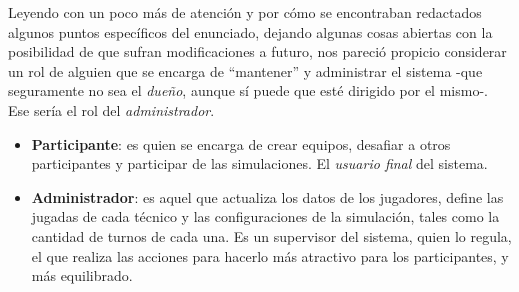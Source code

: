 Leyendo con un poco más de atención y por cómo se encontraban redactados algunos puntos específicos del enunciado, dejando algunas cosas abiertas con la posibilidad de que sufran modificaciones a futuro, nos pareció propicio considerar un rol de alguien que se encarga de ``mantener'' y administrar el sistema -que seguramente no sea el \emph{dueño}, aunque sí puede que esté dirigido por el mismo-. Ese sería el rol del \emph{administrador}.


\begin{itemize}
\item \textbf{Participante}: es quien se encarga de crear equipos, desafiar a otros participantes y participar de las simulaciones. El \textit{usuario final} del sistema.
\item \textbf{Administrador}: es aquel que actualiza los datos de los jugadores, define las jugadas de cada técnico y las configuraciones de la simulación, tales como la cantidad de turnos de cada una. Es un supervisor del sistema, quien lo regula, el que realiza las acciones para hacerlo más atractivo para los participantes, y más equilibrado.
\end{itemize}
